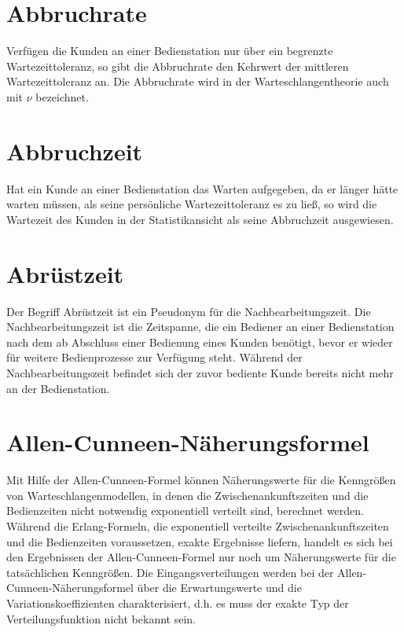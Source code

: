 
\section*{Abbruchrate}


Verfügen die Kunden an einer Bedienstation nur über ein begrenzte
Wartezeittoleranz, so gibt die Abbruchrate den Kehrwert der mittleren Wartezeittoleranz an.
Die Abbruchrate wird in der Warteschlangentheorie auch mit $\nu$ bezeichnet.

\section*{Abbruchzeit}


Hat ein Kunde an einer Bedienstation das Warten aufgegeben, da er
länger hätte warten müssen, als seine persönliche Wartezeittoleranz es zu ließ, so wird die Wartezeit
des Kunden in der Statistikansicht als seine Abbruchzeit ausgewiesen.

\section*{Abrüstzeit}


Der Begriff Abrüstzeit ist ein Pseudonym für die Nachbearbeitungszeit.
Die Nachbearbeitungszeit ist die Zeitspanne, die ein Bediener an einer Bedienstation
nach dem ab Abschluss einer Bedienung eines Kunden benötigt, bevor er wieder für weitere Bedienprozesse zur Verfügung steht.
Während der Nachbearbeitungszeit befindet sich der zuvor bediente Kunde bereits nicht mehr an der Bedienstation.

\section*{Allen-Cunneen-Näherungsformel}


Mit Hilfe der Allen-Cunneen-Formel können Näherungswerte für die Kenngrößen von Warteschlangenmodellen, in denen die
Zwischenankunftszeiten und die Bedienzeiten nicht notwendig exponentiell verteilt sind, berechnet werden. Während die
Erlang-Formeln, die exponentiell verteilte Zwischenankunftszeiten und die Bedienzeiten voraussetzen, exakte Ergebnisse
liefern, handelt es sich bei den Ergebnissen der Allen-Cunneen-Formel nur noch um Näherungswerte für die tatsächlichen
Kenngrößen. Die Eingangsverteilungen werden bei der Allen-Cunneen-Näherungsformel über die Erwartungswerte und die
Variationskoeffizienten charakterisiert, d.h. es muss der exakte Typ der Verteilungsfunktion nicht bekannt sein.

